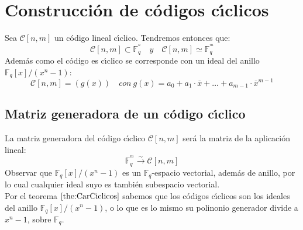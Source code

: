%
% 

\section{Construcci\'on de c\'odigos c\'{\i}clicos}

Sea $\mathcal{C}[n,m]$ un c\'odigo lineal c\'{\i}clico. Tendremos entonces que:
\begin{displaymath}
\mathcal{C}[n,m]\subset \mathbb{F}^{^n}_q\quad y\quad
\mathcal{C}[n,m]\simeq \mathbb{F}^{^m}_q
\end{displaymath}
Adem\'as como el c\'odigo es c\'{\i}clico se corresponde con un ideal del 
anillo $\mathbb{F}_q[x]/(x^n-1)$:
\begin{displaymath}
\mathcal{C}[n,m] = (g(x))\quad con\ g(x)=a_0+a_1\cdot \overline{x}+\dots+
a_{m-1}\cdot \overline{x}^{m-1}
\end{displaymath}

\subsection{Matriz generadora de un c\'odigo c\'{\i}clico}

La matriz generadora del c\'odigo c\'{\i}clico $\mathcal{C}[n,m]$ ser\'a la
matriz de la aplicaci\'on lineal:
\begin{displaymath}
\mathbb{F}^{^m}_q\stackrel{\sim}\longrightarrow \mathcal{C}[n,m]
\end{displaymath}
Observar que $\mathbb{F}_q[x]/(x^n-1)$ es un $\mathbb{F}_q$-espacio vectorial,
adem\'as de anillo, por lo cual cualquier ideal suyo es tambi\'en subespacio
vectorial.\\

Por el teorema $\ref{the:CarCiclicos}$ sabemos que los c\'odigos c\'{\i}clicos
son los ideales del anillo $\mathbb{F}_q[x]/(x^n-1)$, o lo que es lo mismo su
polinonio generador divide a $x^n-1$, sobre $\mathbb{F}_q$.\\

